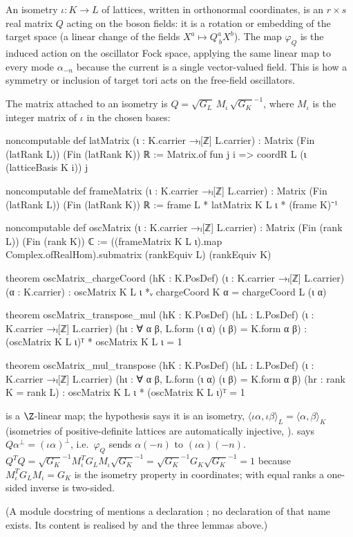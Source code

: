 \begin{physics}
An isometry $\iota\colon K\to L$ of lattices, written in orthonormal coordinates, is an $r\times s$ real matrix $Q$ acting on the boson fields: it is a rotation or embedding of the target space (a linear change of the fields $X^a\mapsto Q^a_{\ b}X^b$). The map $\varphi_Q$ is the induced action on the oscillator Fock space, applying the same linear map to every mode $\alpha_{-n}$ because the current is a single vector-valued field. This is how a symmetry or inclusion of target tori acts on the free-field oscillators.
\end{physics}

The matrix attached to an isometry is $Q=\sqrt{G_L}\,M_\iota\,\sqrt{G_K}^{-1}$, where $M_\iota$ is
the integer matrix of $\iota$ in the chosen bases:
\begin{leancode}
noncomputable def latMatrix (ι : K.carrier →ₗ[ℤ] L.carrier) :
    Matrix (Fin (latRank L)) (Fin (latRank K)) ℝ :=
  Matrix.of fun j i => coordR L (ι (latticeBasis K i)) j

noncomputable def frameMatrix (ι : K.carrier →ₗ[ℤ] L.carrier) :
    Matrix (Fin (latRank L)) (Fin (latRank K)) ℝ :=
  frame L * latMatrix K L ι * (frame K)⁻¹

noncomputable def oscMatrix (ι : K.carrier →ₗ[ℤ] L.carrier) :
    Matrix (Fin (rank L)) (Fin (rank K)) ℂ :=
  ((frameMatrix K L ι).map Complex.ofRealHom).submatrix (rankEquiv L) (rankEquiv K)

theorem oscMatrix_chargeCoord (hK : K.PosDef) (ι : K.carrier →ₗ[ℤ] L.carrier) (α : K.carrier) :
    oscMatrix K L ι *ᵥ chargeCoord K α = chargeCoord L (ι α)

theorem oscMatrix_transpose_mul (hK : K.PosDef) (hL : L.PosDef)
    (ι : K.carrier →ₗ[ℤ] L.carrier) (hι : ∀ α β, L.form (ι α) (ι β) = K.form α β) :
    (oscMatrix K L ι)ᵀ * oscMatrix K L ι = 1

theorem oscMatrix_mul_transpose (hK : K.PosDef) (hL : L.PosDef)
    (ι : K.carrier →ₗ[ℤ] L.carrier) (hι : ∀ α β, L.form (ι α) (ι β) = K.form α β)
    (hr : rank K = rank L) :
    oscMatrix K L ι * (oscMatrix K L ι)ᵀ = 1
\end{leancode}
\begin{dictionary}
 is a $\Z$-linear map; the hypothesis  says it is an
isometry, $\langle\iota\alpha,\iota\beta\rangle_L=\langle\alpha,\beta\rangle_K$ (isometries of
positive-definite lattices are automatically injective, ).
 says $Q\alpha^\perp=(\iota\alpha)^\perp$, i.e.\ $\varphi_Q$ sends
$\alpha(-n)$ to $(\iota\alpha)(-n)$. $Q^TQ=\sqrt{G_K}^{-1}M_\iota^TG_LM_\iota\sqrt{G_K}^{-1}=
\sqrt{G_K}^{-1}G_K\sqrt{G_K}^{-1}=1$ because $M_\iota^TG_LM_\iota=G_K$ is the isometry property in
coordinates; with equal ranks a one-sided inverse is two-sided.
\end{dictionary}
(A module docstring of  mentions a declaration
; no declaration of that name exists. Its content is realised by
 and the three lemmas above.)

